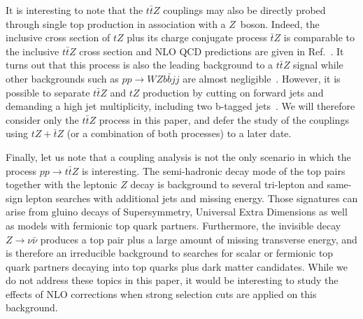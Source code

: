 \documentclass[preprint]{JHEP3}
\def\ttbZ{t\bar{t}Z}
\begin{document}
It is interesting to note that the $\ttbZ$ couplings may also be directly probed through single top production in association with a $Z$~boson. 
Indeed, the inclusive cross section of $tZ$ plus its charge conjugate process $\bar{t}Z$ is comparable to the inclusive $\ttbZ$ cross section 
and NLO QCD predictions are given in Ref.~\cite{Campbell:2013yla}. 
It turns out that this process is also the leading background to a $\ttbZ$ signal while other backgrounds such as $pp\to WZ b \bar{b} jj$ are almost negligible~\cite{Baur:2004uw}.
However, it is possible to separate $\ttbZ$ and $tZ$ production by cutting on forward jets and demanding a high jet multiplicity, including two b-tagged jets~\cite{Campbell:2013yla}. 
We will therefore consider only the $\ttbZ$ process in this paper, and defer the study of the couplings using $tZ+\bar{t}Z$ (or a combination of both processes) to a later date. 



Finally, let us note that a coupling analysis is not the only scenario in which the process $pp\to\ttbZ$ is interesting. 
The semi-hadronic decay mode of the top pairs together with the leptonic $Z$ decay is background to several tri-lepton and same-sign lepton searches with additional jets and missing energy.
Those signatures can arise from gluino decays of Supersymmetry, Universal Extra Dimensions as well as models with fermionic top quark partners. 
Furthermore, the invisible decay $Z \to \nu \bar{\nu}$ produces a top pair plus a large amount of missing transverse energy, and is therefore an irreducible background 
to searches for scalar or fermionic top quark partners decaying into top quarks plus dark matter candidates.
While we do not address these topics in this paper, it would be interesting to study the effects of NLO corrections when strong selection cuts are applied on this background.
\end{document}

